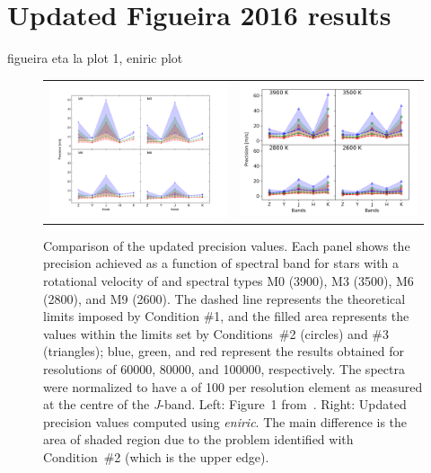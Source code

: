 

\section{ Updated Figueira 2016 results}
 figueira eta la plot 1, eniric plot

\begin{figure}
    \centering
    \begin{tabular}{cc}
        \includegraphics[width=0.48\linewidth]{figures/information-content/Rvprec_vsini1.pdf} &  %
        \includegraphics[width=0.47\linewidth]{figures/information-content/precision_fourpanel.png}\\ %
    \end{tabular}
    \caption[Comparision of {RV} precision results to~\citet{figueira_radial_2016}.]{Comparison of the updated precision values.
        Each panel shows the precision achieved as a function of spectral band for stars with a rotational velocity of \kmps{} and spectral types M0 (3900\K), M3 (3500\K), M6 (2800\K), and M9 (2600\K).
        The dashed line represents the theoretical limits imposed by Condition \#1, and the filled area represents the values within the limits set by Conditions~\#2 (circles) and \#3 (triangles); blue, green, and red represent the results obtained for resolutions of 60000, 80000, and 100000, respectively.
        The spectra were normalized to have a \snr{} of 100 per resolution element as measured at the centre of the \emph{J}-band.
        Left: Figure~1 from~\citet{figueira_radial_2016}.
        Right: Updated precision values computed using \emph{eniric}.
        The main difference is the area of shaded region due to the problem identified with Condition~\#2 (which is the upper edge).}
    \label{fig:figueria_comparision}
\end{figure}



